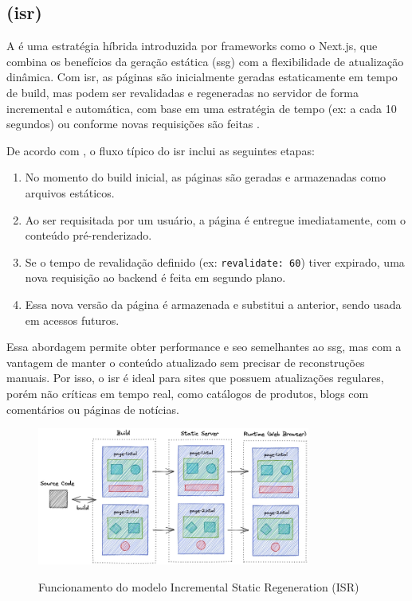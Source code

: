 \subsection{ (\acrshort{isr})}
\label{subsec:isr}

A \textbf{} é uma estratégia híbrida introduzida por frameworks como o Next.js, que combina os benefícios da geração estática (\acrshort{ssg}) com a flexibilidade de atualização dinâmica. Com \acrshort{isr}, as páginas são inicialmente geradas estaticamente em tempo de build, mas podem ser revalidadas e regeneradas no servidor de forma incremental e automática, com base em uma estratégia de tempo (ex: a cada 10 segundos) ou conforme novas requisições são feitas \cite{pahan2021}.

De acordo com , o fluxo típico do \acrshort{isr} inclui as seguintes etapas:

\begin{enumerate}
    \item No momento do build inicial, as páginas são geradas e armazenadas como arquivos estáticos.
    \item Ao ser requisitada por um usuário, a página é entregue imediatamente, com o conteúdo pré-renderizado.
    \item Se o tempo de revalidação definido (ex: \texttt{revalidate: 60}) tiver expirado, uma nova requisição ao backend é feita em segundo plano.
    \item Essa nova versão da página é armazenada e substitui a anterior, sendo usada em acessos futuros.
\end{enumerate}

Essa abordagem permite obter performance e \acrshort{seo} semelhantes ao \acrshort{ssg}, mas com a vantagem de manter o conteúdo atualizado sem precisar de reconstruções manuais. Por isso, o \acrshort{isr} é ideal para sites que possuem atualizações regulares, porém não críticas em tempo real, como catálogos de produtos, blogs com comentários ou páginas de notícias.

\begin{figure}[H]
  \centering
  \caption{Funcionamento do modelo Incremental Static Regeneration (ISR)}
  \includegraphics[width=0.8\textwidth]{media/incremental_static_regeneration.png}
  \label{fig:isr}
\end{figure}

